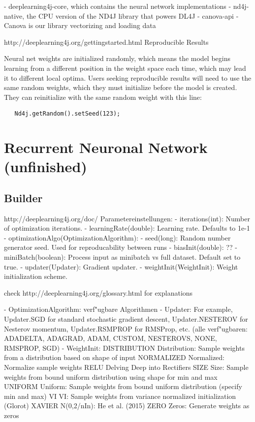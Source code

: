 {   -  deeplearning4j-core, which contains the neural network implementations
   -  nd4j-native, the CPU version of the ND4J library that powers DL4J
    - canova-api - Canova is our library vectorizing and loading data

http://deeplearning4j.org/gettingstarted.html
Reproducible Results

Neural net weights are initialized randomly, which means the model begins learning from a different position in the weight space each time, which may lead it to different local optima. Users seeking reproducible results will need to use the same random weights, which they must initialize before the model is created. They can reinitialize with the same random weight with this line:

\begin{lstlisting}
   Nd4j.getRandom().setSeed(123);
\end{lstlisting}

\section{Recurrent Neuronal Network (unfinished)}
\subsection{Builder}
http://deeplearning4j.org/doc/
Parametereinstellungen:
- iterations(int): Number of optimization iterations.
- learningRate(double): Learning rate. Defaults to 1e-1
- optimizationAlgo(OptimizationAlgorithm):  
- seed(long): Random number generator seed. Used for reproducability between runs
- biasInit(double): ??
- miniBatch(boolean): Process input as minibatch vs full dataset. Default set to true.
- updater(Updater): Gradient updater. 
- weightInit(WeightInit): Weight initialization scheme.

check http://deeplearning4j.org/glossary.html for explanations

- OptimizationAlgorithm: verf"ugbare Algorithmen %
- Updater: For example, Updater.SGD for standard stochastic gradient descent, Updater.NESTEROV for Nesterov momentum, Updater.RSMPROP for RMSProp, etc. (alle verf"ugbaren: ADADELTA, ADAGRAD, ADAM, CUSTOM, NESTEROVS, NONE, RMSPROP, SGD)
- WeightInit:
DISTRIBUTION Distribution: Sample weights from a distribution based on shape of input
NORMALIZED Normalized: Normalize sample weights
RELU Delving Deep into Rectifiers
SIZE Size: Sample weights from bound uniform distribution using shape for min and max
UNIFORM Uniform: Sample weights from bound uniform distribution (specify min and max)
VI VI: Sample weights from variance normalized initialization (Glorot)
XAVIER N(0,2/nIn): He et al. (2015)
ZERO Zeros: Generate weights as zeros

}
